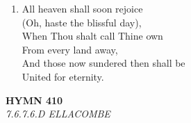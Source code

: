 \begin{enumerate}
    \item All heaven shall soon rejoice \\
        (Oh, haste the blissful day), \\
        When Thou shalt call Thine own \\
        From every land away, \\
        And those now sundered then shall be \\
        United for eternity.

\end{enumerate}

\newpage
\begin{center}
    {\Large \textbf{HYMN 410}}
    \\
    \textit{7.6.7.6.D ELLACOMBE}
\end{center}
\vspace{1em}

